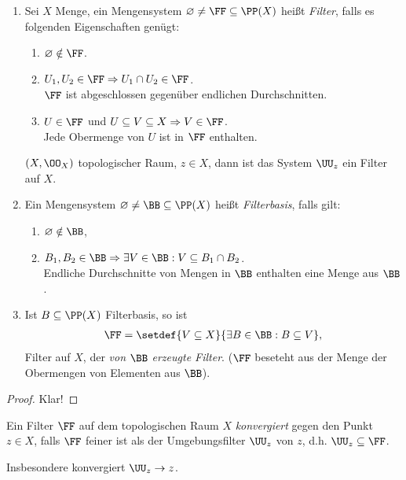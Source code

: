 \begin{lem}
\label{lem:1.5.1}
\begin{enumerate}
  \item Sei $X$ Menge, ein Mengensystem $\varnothing\neq \FF \subseteq \PP(X)$
  heißt \emph{Filter}, falls es folgenden Eigenschaften genügt:
  \begin{enumerate}[label=F\arabic{*})]
    \item $\varnothing\notin \FF$.
    \item $U_1,U_2\in\FF\Rightarrow U_1\cap U_2\in \FF$.\\
     $\FF$ ist abgeschlossen gegenüber endlichen Durchschnitten.
    \item $U\in \FF$ und $U\subseteq V\subseteq X \Rightarrow V\in \FF$.\\
    Jede Obermenge von $U$ ist in $\FF$ enthalten.  
\end{enumerate}
\begin{bspn}
$(X,\OO_X)$ topologischer Raum, $z\in X$, dann ist das System $\UU_z$ ein Filter
auf $X$.\bsphere
\end{bspn}
\item Ein Mengensystem $\varnothing \neq \BB \subseteq \PP(X)$
heißt \emph{Filterbasis}, falls gilt:
\begin{enumerate}[label=FB\arabic{*})]
  \item $\varnothing\notin \BB$,
  \item $B_1,B_2\in\BB \Rightarrow \exists V\in\BB : V\subseteq B_1\cap B_2$.\\
Endliche Durchschnitte von Mengen in $\BB$ enthalten eine Menge aus $\BB$.
\end{enumerate}
\item Ist $B\subseteq\PP(X)$ Filterbasis, so ist
\begin{align*}
\FF = \setdef{V\subseteq X}{\exists B\in \BB : B\subseteq V},
\end{align*}
Filter auf $X$, der \emph{von $\BB$ erzeugte Filter}. ($\FF$ beseteht aus der
Menge der Obermengen von Elementen aus $\BB$).\fishhere
\end{enumerate}
\end{lem}
\begin{proof}
Klar!\qedhere
\end{proof}

\addtocounter{prop}{1}

\begin{defn}
\label{defn:1.5.3}
Ein Filter $\FF$ auf dem topologischen Raum $X$ \emph{konvergiert} gegen den
Punkt $z\in X$, falls $\FF$ feiner ist als der Umgebungsfilter $\UU_z$ von $z$,
d.h. $\UU_z\subseteq \FF$.

Insbesondere konvergiert $\UU_z\to z$.\fishhere
\end{defn}

